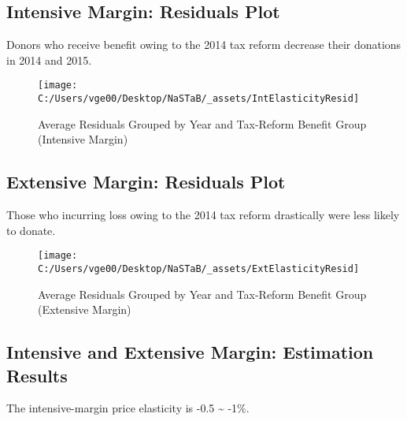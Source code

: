 \documentclass[ review  , 3p ]{elsarticle}
\begin{document}
  \hypertarget{intensive-margin-residuals-plot}{%
  \subsection{Intensive Margin: Residuals Plot}\label{intensive-margin-residuals-plot}}
  
  Donors who receive benefit owing to the 2014 tax reform decrease their donations in 2014 and 2015.
  
  \begin{figure}
  
  {\centering \texttt{[image: C:/Users/vge00/Desktop/NaSTaB/\_assets/IntElasticityResid]} 
  
  }
  
  \caption{Average Residuals Grouped by Year and Tax-Reform Benefit Group (Intensive Margin)}\label{fig:showIntElasticityResid}
  \end{figure}
  
  \hypertarget{extensive-margin-residuals-plot}{%
  \subsection{Extensive Margin: Residuals Plot}\label{extensive-margin-residuals-plot}}
  
  Those who incurring loss owing to the 2014 tax reform drastically were less likely to donate.
  
  \begin{figure}
  
  {\centering \texttt{[image: C:/Users/vge00/Desktop/NaSTaB/\_assets/ExtElasticityResid]} 
  
  }
  
  \caption{Average Residuals Grouped by Year and Tax-Reform Benefit Group (Extensive Margin)}\label{fig:showExtElasticityResid}
  \end{figure}
  
  \hypertarget{intensive-and-extensive-margin-estimation-results}{%
  \subsection{Intensive and Extensive Margin: Estimation Results}\label{intensive-and-extensive-margin-estimation-results}}
  
  The intensive-margin price elasticity is -0.5 \textasciitilde{} -1\%.
  
\end{document}
